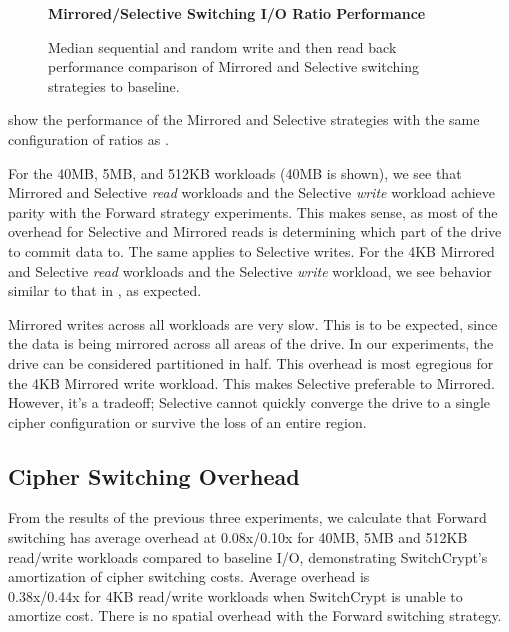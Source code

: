 \begin{figure}[ht]
  \textbf{Mirrored/Selective Switching I/O Ratio Performance}\par\medskip
  \centering
  {} \caption{Median sequential and
  random write and then read back performance comparison of Mirrored and
  Selective switching strategies to baseline.}
 \label{fig:mirrored-selective-baseline}
\end{figure}

 show the performance of the Mirrored and
Selective strategies with the same configuration of ratios as
.

For the 40MB, 5MB, and 512KB workloads (40MB is shown), we see that Mirrored and
Selective \emph{read} workloads and the Selective \emph{write} workload achieve
parity with the Forward strategy experiments. This makes sense, as most of the
overhead for Selective and Mirrored reads is determining which part of the drive
to commit data to. The same applies to Selective writes. For the 4KB Mirrored
and Selective \emph{read} workloads and the Selective \emph{write} workload, we
see behavior similar to that in , as expected.

Mirrored writes across all workloads are very slow. This is to be expected,
since the data is being mirrored across all areas of the drive. In our
experiments, the drive can be considered partitioned in half. This overhead is
most egregious for the 4KB Mirrored write workload. This makes Selective
preferable to Mirrored. However, it's a tradeoff; Selective cannot quickly
converge the drive to a single cipher configuration or survive the loss of an
entire region.

\subsection{Cipher Switching Overhead} \label{subsec:3}

From the results of the previous three experiments, we calculate that Forward
switching has average overhead at 0.08x/0.10x for 40MB, 5MB and 512KB read/write
workloads compared to baseline I/O, demonstrating SwitchCrypt's amortization of
cipher switching costs. Average overhead is\\0.38x/0.44x for 4KB read/write
workloads when SwitchCrypt is unable to amortize cost. There is no spatial
overhead with the Forward switching strategy.

